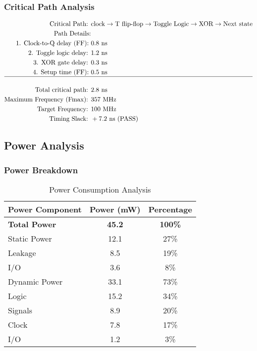 \documentclass[12pt,letterpaper]{article}
\begin{document}
\subsubsection{Critical Path Analysis}
\begin{align}
\text{Critical Path: } &\text{clock} \rightarrow \text{T flip-flop} \rightarrow \text{Toggle Logic} \rightarrow \text{XOR} \rightarrow \text{Next state} \nonumber \\
\text{Path Details:} \nonumber \\
\text{1. Clock-to-Q delay (FF): } &0.8 \text{ ns} \nonumber \\
\text{2. Toggle logic delay: } &1.2 \text{ ns} \nonumber \\
\text{3. XOR gate delay: } &0.3 \text{ ns} \nonumber \\
\text{4. Setup time (FF): } &0.5 \text{ ns} \nonumber \\
\hline \nonumber \\
\text{Total critical path: } &2.8 \text{ ns} \nonumber \\
\text{Maximum Frequency (Fmax): } &357 \text{ MHz} \nonumber \\
\text{Target Frequency: } &100 \text{ MHz} \nonumber \\
\text{Timing Slack: } &+7.2 \text{ ns (PASS)}
\end{align}

\subsection{Power Analysis}

\subsubsection{Power Breakdown}
\begin{table}[H]
\centering
\caption{Power Consumption Analysis}
\begin{tabular}{@{}lcc@{}}
\toprule
\textbf{Power Component} & \textbf{Power (mW)} & \textbf{Percentage} \\
\midrule
\textbf{Total Power} & \textbf{45.2} & \textbf{100\%} \\
\midrule
Static Power & 12.1 & 27\% \\
\quad Leakage & 8.5 & 19\% \\
\quad I/O & 3.6 & 8\% \\
Dynamic Power & 33.1 & 73\% \\
\quad Logic & 15.2 & 34\% \\
\quad Signals & 8.9 & 20\% \\
\quad Clock & 7.8 & 17\% \\
\quad I/O & 1.2 & 3\% \\
\bottomrule
\end{tabular}
\label{tab:power_analysis}
\end{table}
\end{document}
